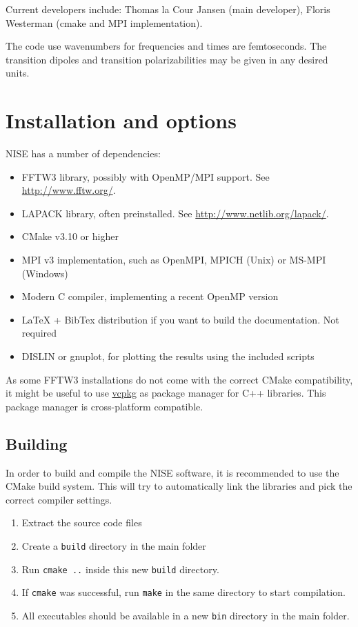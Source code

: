 \documentclass[12pt]{book}
\begin{document}
Current developers include: Thomas la Cour Jansen (main developer), Floris Westerman (cmake and MPI implementation).

The code use wavenumbers for frequencies and times are femtoseconds. The transition
dipoles and transition polarizabilities may be given in any desired units.

\chapter{Installation and options}
NISE has a number of dependencies:
\begin{itemize}
\item FFTW3 library, possibly with OpenMP/MPI support. See \url{http://www.fftw.org/}.
\item LAPACK library, often preinstalled. See \url{http://www.netlib.org/lapack/}.
\item CMake v3.10 or higher
\item MPI v3 implementation, such as OpenMPI, MPICH (Unix) or MS-MPI (Windows)
\item Modern C compiler, implementing a recent OpenMP version
\item LaTeX + BibTex distribution if you want to build the documentation. Not required
\item DISLIN or gnuplot, for plotting the results using the included scripts
\end{itemize}
As some FFTW3 installations do not come with the correct CMake compatibility, it might be useful to use \href{https://github.com/microsoft/vcpkg}{vcpkg} as package manager for C++ libraries. This package manager is cross-platform compatible.

\section{Building}
In order to build and compile the NISE software, it is recommended to use the CMake build system. This will try to automatically link the libraries and pick the correct compiler settings.
\begin{enumerate}
\item Extract the source code files
\item Create a \texttt{build} directory in the main folder
\item Run \texttt{cmake ..} inside this new {\tt build} directory.
\item If {\tt cmake} was successful, run {\tt make} in the same directory to start compilation.
\item All executables should be available in a new {\tt bin} directory in the main folder.
\end{enumerate}
\end{document}
